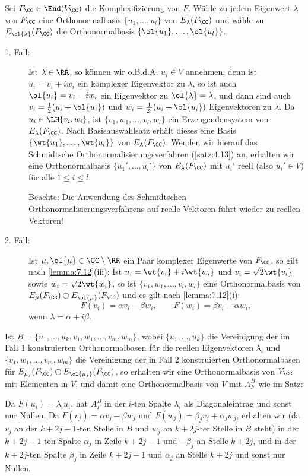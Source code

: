 \begin{beweis}
	Sei $F_{\CC} \in \End(V_{\CC})$ die Komplexifizierung von $F$.
	Wähle zu jedem Eigenwert $\lambda$ von $F_{\CC}$ eine Orthonormalbasis $\{u_1,\dots,u_l\}$ von $E_{\lambda}(F_{\CC})$ und wähle zu $E_{\ol{\lambda}}(F_{\CC})$ die Orthonormalbasis $\{\ol{u_1},\dots,\ol{u_l}\}$.
	\begin{description}
		\item[1. Fall:] Ist $\lambda \in \RR$, so können wir o.B.d.A. $u_i \in V$ annehmen, denn ist $u_i = v_i + iw_i$ ein komplexer Eigenvektor zu $\lambda$, so ist auch $\ol{u_i} = v_i - iw_i$ ein Eigenvektor zu $\ol{\lambda} = \lambda$, und dann sind auch $v_i = \frac{1}{2}(u_i + \ol{u_i})$ und $w_i = \frac{1}{2i}(u_i + \ol{u_i})$ Eigenvektoren zu $\lambda$.
		Da $u_i \in \LH\{v_i,w_i\}$, ist $\{v_1,w_1,\dots, v_l,w_l\}$ ein Erzeugendensystem von $E_{\lambda}(F_{\CC})$.
		Nach Basisauswahlsatz erhält dieses eine Basis $\{\wt{u_1},\dots,\wt{u_l}\}$ von $E_{\lambda}(F_{\CC})$.
		Wenden wir hierauf das Schmidtsche Orthonormalisierungsverfahren (\autoref{satz:4.13}) an, erhalten wir eine Orthonormalbasis $\{u_1',\dots,u_l'\}$ von $E_\lambda(F_{\CC})$ mit $u_i'$ reell (also $u_i' \in V$) für alle $1 \leq i \leq l$.
		
		Beachte: Die Anwendung des Schmidtschen Orthonormalisierungsverfahrens auf reelle Vektoren führt wieder zu reellen Vektoren!
		\item[2. Fall:] Ist $\mu, \ol{\mu} \in \CC \setminus \RR$ ein Paar komplexer Eigenwerte von $F_{\CC}$, so gilt nach \autoref{lemma:7.12}(iii):
		Ist $u_i = \wt{v_i} + i \wt{w_i}$ und $v_i = \sqrt{2} \wt{v_i}$ sowie $w_i = \sqrt{2} \wt{w_i}$, so ist $\{v_1,w_1,\dots,v_l,w_l\}$ eine Orthonormalbasis von $E_\mu(F_{\CC}) \oplus E_{\ol{\mu}}(F_{\CC})$ und es gilt nach \autoref{lemma:7.12}(i): 
		\[
			F(v_i) = \alpha v_i - \beta w_i, \qquad F(w_i) = \beta v_i - \alpha w_i,
		\]
		wenn $\lambda = \alpha + i \beta$.
	\end{description}
	Ist $B = \{u_1,\dots,u_k,v_1,w_1,\dots,v_m,w_m\}$, wobei $\{u_1,\dots,u_k\}$ die Vereinigung der im Fall 1 konstruierten Orthonormalbasen für die reellen Eigenvektoren $\lambda_i$ und $\{v_1,w_1,\dots,v_m,w_m\}$ die Vereinigung der in Fall 2 konstruierten Orthonormalbasen für $E_{\mu_j}(F_{\CC}) \oplus E_{\ol{\mu_j}}(F_{\CC})$, so erhalten wir eine Orthonormalbasis von $V_{\CC}$ mit Elementen in $V$, und damit eine Orthonormalbasis von $V$ mit $A_F^B$ wie im Satz:
		
	Da $F(u_i) = \lambda_i u_i$, hat $A_F^B$ in der $i$-ten Spalte $\lambda_i$ als Diagonaleintrag und sonst nur Nullen.
	Da $F(v_j) = \alpha v_j - \beta w_j$ und $F(w_j) = \beta_j v_j + \alpha_j w_j$, erhalten wir (da $v_j$ an der $k+2j-1$-ten Stelle in $B$ und $w_j$ an $k+2j$-ter Stelle in $B$ steht) in der $k+2j-1$-ten Spalte $\alpha_j$ in Zeile $k+2j-1$ und $-\beta_j$ an Stelle $k+2j$, und in der $k+2j$-ten Spalte $\beta_j$ in Zeile $k+2j-1$ und $\alpha_j$ an Stelle $k+2j$ und sonst nur Nullen. 	
\end{beweis}

